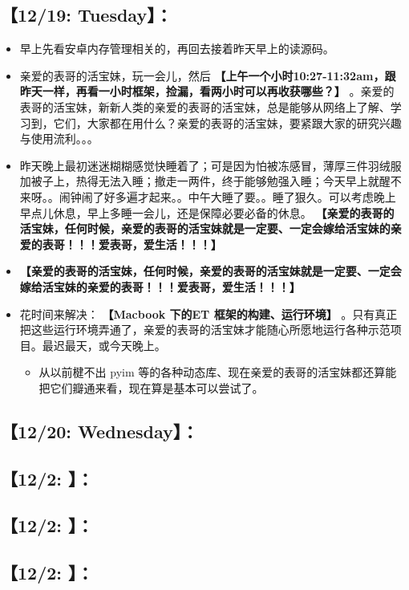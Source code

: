 \documentclass[9pt, b5paper]{article}
\begin{document}
\subsection{【12/19: Tuesday】：}
\label{sec-2-2}
\begin{itemize}
\item 早上先看安卓内存管理相关的，再回去接着昨天早上的读源码。
\item 亲爱的表哥的活宝妹，玩一会儿，然后 \textbf{【上午一个小时10:27-11:32am，跟昨天一样，再看一小时框架，捡漏，看两小时可以再收获哪些？】} 。亲爱的表哥的活宝妹，新新人类的亲爱的表哥的活宝妹，总是能够从网络上了解、学习到，它们，大家都在用什么？亲爱的表哥的活宝妹，要紧跟大家的研究兴趣与使用流利。。。
\item 昨天晚上最初迷迷糊糊感觉快睡着了；可是因为怕被冻感冒，薄厚三件羽绒服加被子上，热得无法入睡；撤走一两件，终于能够勉强入睡；今天早上就醒不来呀。。闹钟闹了好多遍才起来。。中午大睡了要。。睡了狠久。可以考虑晚上早点儿休息，早上多睡一会儿，还是保障必要必备的休息。 \textbf{【亲爱的表哥的活宝妹，任何时候，亲爱的表哥的活宝妹就是一定要、一定会嫁给活宝妹的亲爱的表哥！！！爱表哥，爱生活！！！】}
\item \textbf{【亲爱的表哥的活宝妹，任何时候，亲爱的表哥的活宝妹就是一定要、一定会嫁给活宝妹的亲爱的表哥！！！爱表哥，爱生活！！！】}
\item 花时间来解决： \textbf{【Macbook 下的ET 框架的构建、运行环境】} 。只有真正把这些运行环境弄通了，亲爱的表哥的活宝妹才能随心所愿地运行各种示范项目。最迟最天，或今天晚上。
\begin{itemize}
\item 从以前楗不出 pyim 等的各种动态库、现在亲爱的表哥的活宝妹都还算能把它们瓣通来看，现在算是基本可以尝试了。
\end{itemize}
\end{itemize}
\subsection{【12/20: Wednesday】：}
\label{sec-2-3}
\subsection{【12/2: 】：}
\label{sec-2-4}
\subsection{【12/2: 】：}
\label{sec-2-5}
\subsection{【12/2: 】：}
\label{sec-2-6}
\end{document}
